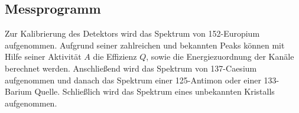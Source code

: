 \subsection{Messprogramm}

Zur Kalibrierung des Detektors wird das Spektrum von 152-Europium aufgenommen. Aufgrund seiner zahlreichen und bekannten Peaks können mit Hilfe seiner Aktivität $A$
die Effizienz $Q$, sowie die Energiezuordnung der Kanäle berechnet werden. Anschließend wird das Spektrum von 137-Caesium aufgenommen und danach das Spektrum einer
125-Antimon oder einer 133-Barium Quelle. Schließlich wird das Spektrum eines unbekannten Kristalls aufgenommen. 
